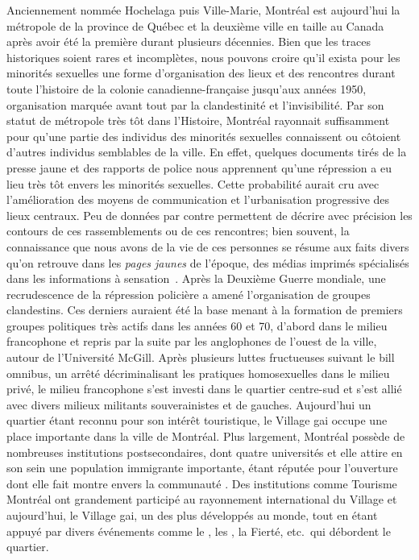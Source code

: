 Anciennement nommée Hochelaga puis Ville-Marie, Montréal est aujourd'hui la métropole de la province de Québec et la deuxième ville en taille au Canada après avoir été la première durant plusieurs décennies.
Bien que les traces historiques soient rares et incomplètes, nous pouvons croire qu'il exista pour les minorités sexuelles une forme d'organisation des lieux et des rencontres durant toute l'histoire de la colonie canadienne-française jusqu’aux années 1950, organisation marquée avant tout par la clandestinité et l'invisibilité.
Par son statut de métropole très tôt dans l'Histoire, Montréal rayonnait suffisamment pour qu'une partie des individus des minorités sexuelles connaissent ou côtoient d'autres individus semblables de la ville.
En effet, quelques documents tirés de la presse jaune et des rapports de police nous apprennent qu'une répression a eu lieu très tôt envers les minorités sexuelles.
Cette probabilité aurait cru avec l'amélioration des moyens de communication et l'urbanisation progressive des lieux centraux.
Peu de données par contre permettent de décrire avec précision les contours de ces rassemblements ou de ces rencontres; bien souvent, la connaissance que nous avons de la vie de ces personnes se résume aux faits divers qu'on retrouve dans les \emph{pages jaunes} de l'époque, des médias imprimés spécialisés dans les informations à sensation~\citep[]{Higgins1999}.
Après la Deuxième Guerre mondiale, une recrudescence de la répression policière a amené l'organisation de groupes clandestins.
Ces derniers auraient été la base menant à la formation de premiers groupes politiques très actifs dans les années 60 et 70, d'abord dans le milieu francophone et repris par la suite par les anglophones de l'ouest de la ville, autour de l'Université McGill.
Après plusieurs luttes fructueuses suivant le bill omnibus, un arrêté décriminalisant les pratiques homosexuelles dans le milieu privé, le milieu francophone s'est investi dans le quartier centre-sud et s'est allié avec divers milieux militants souverainistes et de gauches.
Aujourd'hui un quartier étant reconnu pour son intérêt touristique, le Village gai occupe une place importante dans la ville de Montréal.
Plus largement, Montréal possède de nombreuses institutions postsecondaires, dont quatre universités et elle attire en son sein une population immigrante importante, étant réputée pour l'ouverture dont elle fait montre envers la communauté \lgbt{}.
Des institutions comme Tourisme Montréal ont grandement participé au rayonnement international du Village et aujourd'hui, le Village gai, un des plus développés au monde, tout en étant appuyé par divers événements comme le , les , la Fierté, etc.\ qui débordent le quartier.

